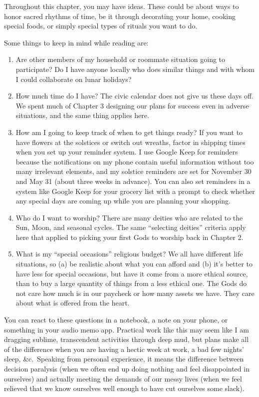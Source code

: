 \documentclass[
]{book}
\providecommand{\tightlist}{%
  \setlength{\itemsep}{0pt}\setlength{\parskip}{0pt}}
\begin{document}
Throughout this chapter, you may have ideas. These could be about ways to honor sacred rhythms of time, be it through decorating your home, cooking special foods, or simply special types of rituals you want to do.

Some things to keep in mind while reading are:

\begin{enumerate}
\def\labelenumi{\arabic{enumi}.}
\tightlist
\item
  Are other members of my household or roommate situation going to participate? Do I have anyone locally who does similar things and with whom I could collaborate on lunar holidays?
\item
  How much time do I have? The civic calendar does not give us these days off. We spent much of Chapter 3 designing our plans for success even in adverse situations, and the same thing applies here.
\item
  How am I going to keep track of when to get things ready? If you want to have flowers at the solstices or switch out wreaths, factor in shipping times when you set up your reminder system. I use Google Keep for reminders because the notifications on my phone contain useful information without too many irrelevant elements, and my solstice reminders are set for November 30 and May 31 (about three weeks in advance). You can also set reminders in a system like Google Keep for your grocery list with a prompt to check whether any special days are coming up while you are planning your shopping.
\item
  Who do I want to worship? There are many deities who are related to the Sun, Moon, and seasonal cycles. The same ``selecting deities'' criteria apply here that applied to picking your first Gods to worship back in Chapter 2.
\item
  What is my ``special occasions'' religious budget? We all have different life situations, so (a) be realistic about what you can afford and (b) it's better to have less for special occasions, but have it come from a more ethical source, than to buy a large quantity of things from a less ethical one. The Gods do not care how much is in our paycheck or how many assets we have. They care about what is offered from the heart.
\end{enumerate}

You can react to these questions in a notebook, a note on your phone, or something in your audio memo app. Practical work like this may seem like I am dragging sublime, transcendent activities through deep mud, but plans make all of the difference when you are having a hectic week at work, a bad few nights' sleep, \&c.~Speaking from personal experience, it means the difference between decision paralysis (when we often end up doing nothing and feel disappointed in ourselves) and actually meeting the demands of our messy lives (when we feel relieved that we know ourselves well enough to have cut ourselves some slack).
\end{document}
